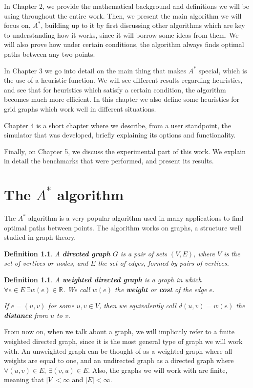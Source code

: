\documentclass[a4paper,10pt]{report}
\newtheorem{definition}[theorem]{Definition}
\begin{document}
In Chapter 2, we provide the mathematical background and definitions we will be using throughout the entire work. Then, we present the main algorithm we will focus on, $A^*$, building up to it by first discussing other algorithms which are key to understanding how it works, since it will borrow some ideas from them. We will also prove how under certain conditions, the algorithm always finds optimal paths between any two points.

In Chapter 3 we go into detail on the main thing that makes $A^*$ special, which is the use of a heuristic function. We will see different results regarding heuristics, and see that for heuristics which satisfy a certain condition, the algorithm becomes much more efficient. In this chapter we also define some heuristics for grid graphs which work well in different situations.

Chapter 4 is a short chapter where we describe, from a user standpoint, the simulator that was developed, briefly explaining its options and functionality.

Finally, on Chapter 5, we discuss the experimental part of this work. We explain in detail the benchmarks that were performed, and present its results.


\chapter{The $A^*$ algorithm}
\label{chapter:algorithms}
The $A^*$ algorithm is a very popular algorithm used in many applications to find optimal paths between points. The algorithm works on graphs, a structure well studied in graph theory.

\begin{definition}
A \textbf{directed graph} $G$ is a pair of sets $(V, E)$, where $V$ is the set of vertices or nodes, and $E$ the set of edges, formed by pairs of vertices.
\end{definition}

\begin{definition}
A \textbf{weighted directed graph} is a graph in which $\forall e \in E \ \exists w(e) \in \mathbb{R}$. We call $w(e)$ the \textbf{weight} or \textbf{cost} of the edge $e$.

If $e = (u, v)$ for some $u, v \in V$, then we equivalently call $d(u, v) = w(e)$ the \textbf{distance} from $u$ to $v$.
\end{definition}

From now on, when we talk about a graph, we will implicitly refer to a finite weighted directed graph, since it is the most general type of graph we will work with. An unweighted graph can be thought of as a weighted graph where all weights are equal to one, and an undirected graph as a directed graph where $\forall (u, v) \in E,\  \exists (v, u) \in E$. Also, the graphs we will work with are finite, meaning that $|V| < \infty$ and $|E| < \infty$.
\end{document}
